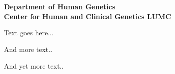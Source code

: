 \documentclass[a4, portrait]{seminar}
\begin{document}

\begin{slide}
\vspace*{1.5cm}
\begin{center}
{\bf\Large{\myTitle}}\\
\vfill
{\bf
  \small{\me}\\
  \small{Department of Human Genetics}\\
  \small{Center for Human and Clinical Genetics}
  \small{LUMC}
}
\vspace{1.1cm}
\end{center}
\end{slide}



\begin{slide}
Text goes here...
\vfill
\end{slide}

\begin{slide}
And more text..
\vfill
\end{slide}

\begin{slide}
And yet more text..
\vfill
\end{slide}

\begin{slide}
\vfill
\label{LastPage}
\end{slide}
\end{document}
